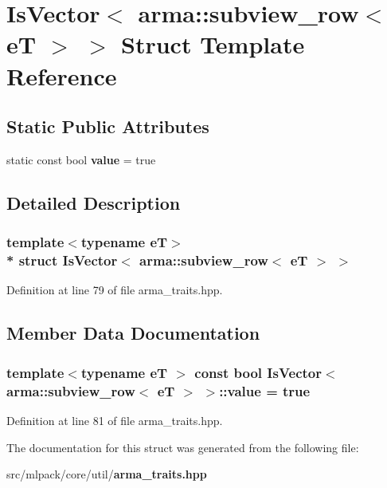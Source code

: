 \section{Is\+Vector$<$ arma\+:\+:subview\+\_\+row$<$ eT $>$ $>$ Struct Template Reference}
\label{structIsVector_3_01arma_1_1subview__row_3_01eT_01_4_01_4}
\subsection*{Static Public Attributes}
\begin{DoxyCompactItemize}
\item 
static const bool {\bf value} = true
\end{DoxyCompactItemize}


\subsection{Detailed Description}
\subsubsection*{template$<$typename eT$>$\\*
struct Is\+Vector$<$ arma\+::subview\+\_\+row$<$ e\+T $>$ $>$}



Definition at line 79 of file arma\+\_\+traits.\+hpp.



\subsection{Member Data Documentation}
\subsubsection[{value}]{\setlength{\rightskip}{0pt plus 5cm}template$<$typename eT $>$ const bool {\bf Is\+Vector}$<$ arma\+::subview\+\_\+row$<$ eT $>$ $>$\+::value = true\hspace{0.3cm}{\ttfamily [static]}}\label{structIsVector_3_01arma_1_1subview__row_3_01eT_01_4_01_4_aa89229a6d5fd4fd5b946217d20151c48}


Definition at line 81 of file arma\+\_\+traits.\+hpp.



The documentation for this struct was generated from the following file\+:\begin{DoxyCompactItemize}
\item 
src/mlpack/core/util/{\bf arma\+\_\+traits.\+hpp}\end{DoxyCompactItemize}
